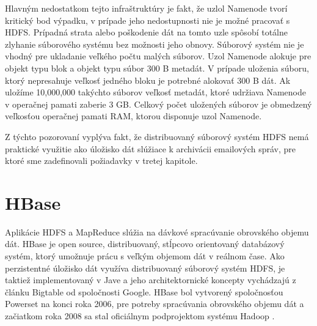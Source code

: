 \documentclass[11pt,twoside,a4paper]{book}
\begin{document}

Hlavným nedostatkom tejto infraštruktúry je fakt, že uzlol Namenode tvorí kritický bod výpadku, v prípade jeho nedostupnosti nie je možné pracovať s HDFS. Prípadná strata alebo poškodenie dát na tomto uzle spôsobí totálne zlyhanie súborového systému bez možnosti jeho obnovy. Súborový systém nie je vhodný pre ukladanie veľkého počtu malých súborov.
Uzol Namenode alokuje pre objekt typu blok a objekt typu súbor 300 B metadát. V prípade uloženia súboru, ktorý nepresahuje veľkosť jedného bloku je potrebné alokovať 300 B dát. Ak uložíme 10,000,000 takýchto súborov veľkosť metadát, ktoré udržiava Namenode v operačnej pamati zaberie 3 GB. Celkový počet uložených súborov je obmedzený veľkosťou operačnej pamati RAM, ktorou disponuje uzol Namenode.

Z týchto pozorovaní vyplýva fakt, že distribuovaný súborový systém HDFS nemá praktické využitie ako úložisko dát slúžiace k archivácii emailových správ, pre ktoré sme zadefinovali požiadavky v tretej kapitole. %
% 
% 



\section*{HBase}


Aplikácie HDFS a MapReduce slúžia na dávkové spracúvanie obrovského objemu dát. HBase je open source, distribuovaný, stĺpcovo orientovaný databázový systém, ktorý umožnuje prácu s veľkým objemom dát v reálnom čase. Ako perzistentné úložisko dát využíva distribuovaný súborový systém HDFS, je taktiež implementovaný v Jave a jeho architektornické koncepty vychádzajú z článku Bigtable od spoločnosti Google. HBase bol vytvorený spoločnosťou Powerset na konci roka 2006, pre potreby spracúvania obrovského objemu dát a začiatkom roka 2008 sa stal oficiálnym podprojektom systému Hadoop \cite{White:2009:HDG:1717298}.
\end{document}
